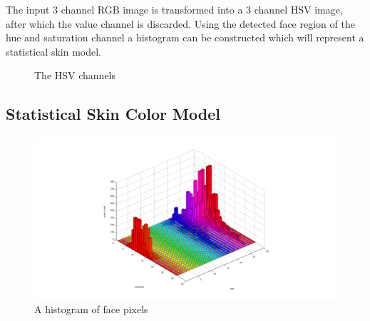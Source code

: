 The input 3 channel RGB image is transformed into a 3 channel HSV image, after which the value channel is discarded. Using the detected face region of the hue and saturation channel a histogram can be constructed which will represent a statistical skin model.

\begin{figure}[htbp]
  \centering
{}
\hspace{0.03\linewidth}
\hspace{0.03\linewidth}
  \caption{The HSV channels}
  \label{fig:hsvchannels}
\end{figure}





\subsection*{Statistical Skin Color Model}

\begin{figure}[htbp]
    \center{}
    \includegraphics[width=1\textwidth]{figures/pipeline/histogram.png}
	\caption{A histogram of face pixels}
	\label{fig:histogram}
\end{figure}

